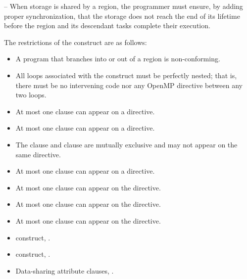 \notestart
\noteheader – When storage is shared by a  region, the programmer must ensure, by adding proper synchronization, that the storage does not reach the end of its lifetime before the  region and its descendant tasks complete their execution.
\noteend

\restrictions
The restrictions of the  construct are as follows:
\begin{itemize}
\item A program that branches into or out of a  region is non-conforming.
\item All loops associated with the  construct must be perfectly nested; that is, there must be no intervening code nor any OpenMP directive between any two loops.
\item At most one  clause can appear on a  directive.
\item At most one  clause can appear on a  directive.
\item The  clause and  clause are mutually exclusive and may not appear on the same  directive.
\item At most one  clause can appear on a  directive.
\item At most one  clause can appear on the directive.
\item At most one  clause can appear on the directive. 
\item At most one  clause can appear on the directive.
\end{itemize}

\crossreferences
\begin{itemize}
\item {} construct, .
\item {} construct, .
\item Data-sharing attribute clauses, . 
\end{itemize}






%
%
